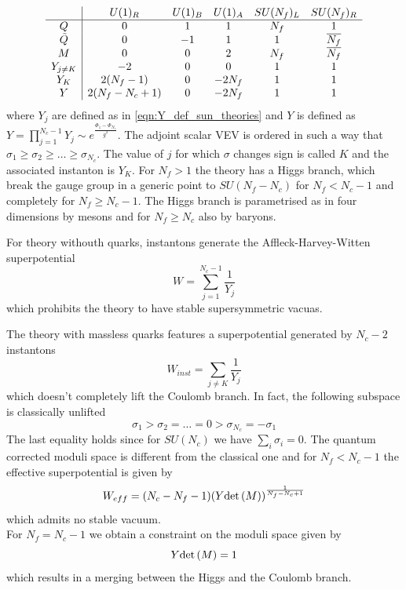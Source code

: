  \begin{equation}
\begin{array}{ c | c c c c c}
  & U(1)_R & U(1)_B & U(1)_A & SU(N_f)_L & SU(N_f)_R \\
 \hline
 Q & 0 &1 & 1 & N_f & 1 \\  
 \tilde{Q}& 0 &-1 & 1 &1 & \overline{N_f}  \\  
   M & 0 & 0 & 2 & N_f & \overline{N_f}\\  
   Y_{j \neq K} & -2 & 0  & 0 &  1 & 1 \\
   Y_{K} & 2 (N_f -1 ) & 0 & - 2 N_f & 1 & 1 \\
   Y & 2 ( N_f -N_c +1) & 0 & - 2 N_f & 1 & 1 \\
\end{array}
\end{equation}
where $Y_j$ are defined as in \eqref{eqn:Y_def_sun_theories} and $Y$ is defined as $Y = \prod_{j=1}^{N_c -1} Y_j \sim e^{ \frac{ \Phi_1 - \Phi_{N_c}  }{g^2}}$.
The adjoint scalar VEV is ordered in such a way that $ \sigma_1 \geq \sigma_2 \geq \dotsc \geq \sigma_{N_c}$. The value of $j$ for which $\sigma$ changes sign is called $K$ and the associated instanton is $Y_K$.
For $N_f > 1$ the theory has a Higgs branch, which break the gauge group in a generic point to $SU(N_f -N_c)$ for $N_f <N_c -1 $ and completely for $N_f \geq N_c - 1$. 
The Higgs branch is parametrised as in four dimensions by mesons and for $N_f \geq N_c$ also by baryons.

For theory withouth quarks, instantons generate the Affleck-Harvey-Witten \cite{Affleck:1982as} superpotential
\begin{equation}
W = \sum_{j=1}^{N_c - 1} \frac{1}{Y_j}
\end{equation}
which prohibits the theory to have stable supersymmetric vacuas.

The theory with massless quarks features a superpotential generated by $N_c - 2$ instantons 
\begin{equation}
W_{inst} = \sum_{j \neq K} \frac{1}{Y_j}
\end{equation}
which doesn't completely lift the Coulomb branch.
In fact, the following subspace is classically unlifted
\begin{equation}
 \sigma_1 > \sigma_2 = \dots = 0 > \sigma_{N_c} = - \sigma_1
\end{equation}
The last equality holds since for $SU(N_c)$ we have $\sum_i \sigma_i = 0$.
The quantum corrected moduli space is different from the classical one and for $N_f < N_c -1 $ the effective superpotential is given by
\begin{equation}
 W_{eff} = (N_c - N_f - 1) ( Y \mathrm{det } \,{(M)} ) ^{\frac{1}{N_f - N_c +1}}
\end{equation}
which admits no stable vacuum.\\
For $N_f = N_c - 1 $ we obtain a constraint on the moduli space given by 
\begin{equation}
Y \mathrm{det } \,( M) = 1
\end{equation}
which results in a merging between the Higgs and the Coulomb branch.

